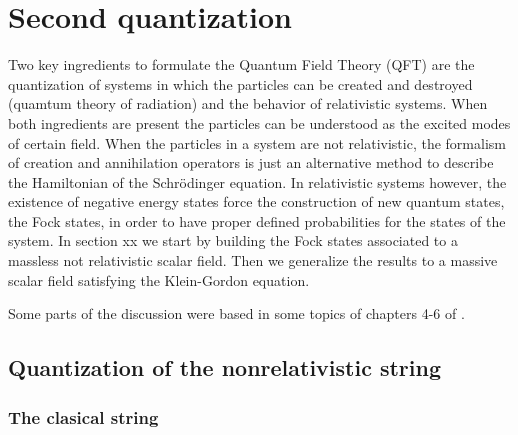 \chapter{Second quantization}
\label{cha:second-quantization} %


Two key ingredients to formulate the Quantum Field Theory (QFT) are the quantization of systems in which the particles can be created and destroyed (quamtum theory of radiation) and the behavior of relativistic systems. When both ingredients are present the particles can be understood as the excited modes of certain field. When the particles in a system are not relativistic, the formalism of creation and annihilation operators is just an alternative method to describe the Hamiltonian of the Schr\"odinger equation. In relativistic systems however, the existence of negative energy states force the construction of new quantum states, the Fock states, in order to have proper defined probabilities for the states of the system. In section xx we start by building the Fock states associated to a massless not relativistic scalar field. Then we generalize the results to a massive scalar field satisfying the Klein-Gordon equation.

Some parts of the discussion were based in some topics of chapters 4-6 of \cite{Maggiore:2005qv}.


\section{Quantization of the nonrelativistic string}
\label{sec:fock-space-real}

\subsection{The clasical string}
\label{sec:clasical-string}

